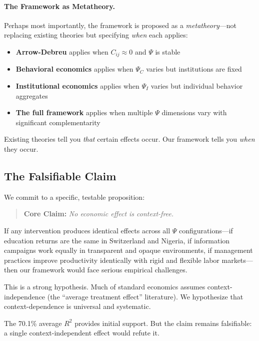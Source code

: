 \documentclass[12pt,a4paper]{article}
\begin{document}
\paragraph{The Framework as Metatheory.}
Perhaps most importantly, the framework is proposed as a \emph{metatheory}---not replacing existing theories but specifying \emph{when} each applies:

\begin{itemize}
  \item \textbf{Arrow-Debreu} applies when $C_{ij} \approx 0$ and $\Psi$ is stable
  \item \textbf{Behavioral economics} applies when $\Psi_C$ varies but institutions are fixed
  \item \textbf{Institutional economics} applies when $\Psi_I$ varies but individual behavior aggregates
  \item \textbf{The full framework} applies when multiple $\Psi$ dimensions vary with significant complementarity
\end{itemize}

Existing theories tell you \emph{that} certain effects occur. Our framework tells you \emph{when} they occur.

\subsection{The Falsifiable Claim}

We commit to a specific, testable proposition:

\begin{quote}
\textbf{Core Claim:} \emph{No economic effect is context-free.}
\end{quote}

If any intervention produces identical effects across all $\Psi$ configurations---if education returns are the same in Switzerland and Nigeria, if information campaigns work equally in transparent and opaque environments, if management practices improve productivity identically with rigid and flexible labor markets---then our framework would face serious empirical challenges.

This is a strong hypothesis. Much of standard economics assumes context-independence (the ``average treatment effect'' literature). We hypothesize that context-dependence is universal and systematic.

The 70.1\% average $R^2$ provides initial support. But the claim remains falsifiable: a single context-independent effect would refute it.
\end{document}
